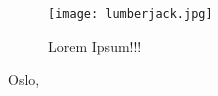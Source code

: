\lipsum[1-5]
\begin{figure}[h]
    \centering
    \texttt{[image: lumberjack.jpg]}
    \captionsetup{labelformat=empty}
    \caption{\textsf{Lorem Ipsum!!!}}
    \label{fig:ds}
\end{figure}
\lipsum[6-12]

Oslo, 
